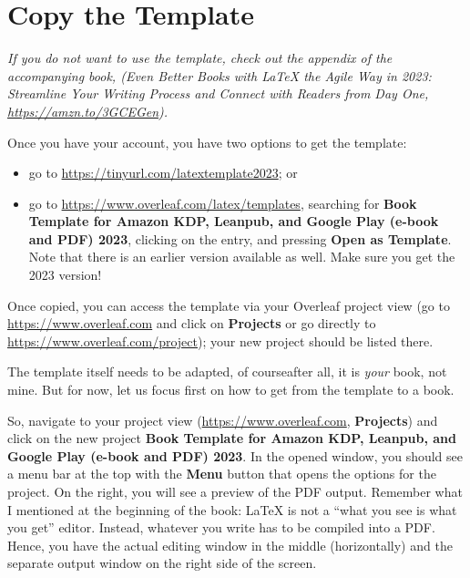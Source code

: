 \section{Copy the Template}
\label{copytemplate:sec}

\textit{If you do not want to use the template, check out the appendix of the accompanying book, (\textit{Even Better Books with LaTeX the Agile Way in 2023: Streamline Your Writing Process and Connect with Readers from Day One}, \url{https://amzn.to/3GCEGen}).}


Once you have your account, you have two options to get the template:

\begin{itemize}
\item go to \url{https://tinyurl.com/latextemplate2023}; or
\item go to \url{https://www.overleaf.com/latex/templates}, searching for \textbf{Book Template for Amazon KDP, Leanpub, and Google Play (e-book and PDF) 2023}, clicking on the entry, and pressing \textbf{Open as Template}. Note that there is an earlier version available as well. Make sure you get the 2023 version!
\end{itemize}

Once copied, you can access the template via your Overleaf project view (go to \url{https://www.overleaf.com} and click on \textbf{Projects} or go directly to \url{https://www.overleaf.com/project}); your new project should be listed there.

The template itself needs to be adapted, of course\emdash{}after all, it is \textit{your} book, not mine. But for now, let us focus first on how to get from the template to a book.

So, navigate to your project view (\url{https://www.overleaf.com}, \textbf{Projects}) and click on the new project \textbf{Book Template for Amazon KDP, Leanpub, and Google Play (e-book and PDF) 2023}. In the opened window, you should see a menu bar at the top with the \textbf{Menu} button that opens the options for the project. On the right, you will see a preview of the PDF output. Remember what I mentioned at the beginning of the book: LaTeX is not a ``what you see is what you get'' editor. Instead, whatever you write has to be compiled into a PDF. Hence, you have the actual editing window in the middle (horizontally) and the separate output window on the right side of the screen.

